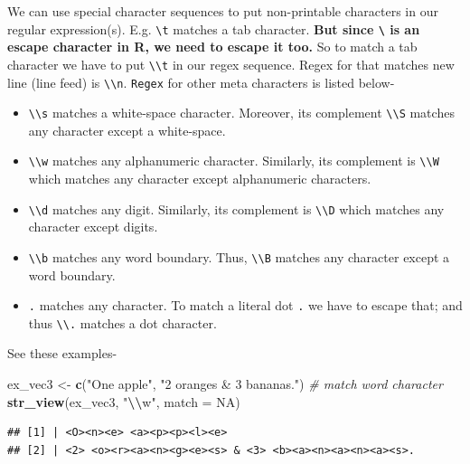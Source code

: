 \documentclass[
]{book}
\newenvironment{Shaded}{\begin{snugshade}}{\end{snugshade}}
\newcommand{\AttributeTok}[1]{\textcolor[rgb]{0.13,0.29,0.53}{#1}}
\newcommand{\CommentTok}[1]{\textcolor[rgb]{0.56,0.35,0.01}{\textit{#1}}}
\newcommand{\ConstantTok}[1]{\textcolor[rgb]{0.56,0.35,0.01}{#1}}
\newcommand{\FunctionTok}[1]{\textcolor[rgb]{0.13,0.29,0.53}{\textbf{#1}}}
\newcommand{\NormalTok}[1]{#1}
\newcommand{\OtherTok}[1]{\textcolor[rgb]{0.56,0.35,0.01}{#1}}
\newcommand{\SpecialCharTok}[1]{\textcolor[rgb]{0.81,0.36,0.00}{\textbf{#1}}}
\newcommand{\StringTok}[1]{\textcolor[rgb]{0.31,0.60,0.02}{#1}}
\providecommand{\tightlist}{%
  \setlength{\itemsep}{0pt}\setlength{\parskip}{0pt}}
\begin{document}
We can use special character sequences to put non-printable characters in our regular expression(s). E.g. \texttt{\textbackslash{}t} matches a tab character. \textbf{But since \texttt{\textbackslash{}} is an escape character in R, we need to escape it too.} So to match a tab character we have to put \texttt{\textbackslash{}\textbackslash{}t} in our regex sequence. Regex for that matches new line (line feed) is \texttt{\textbackslash{}\textbackslash{}n}. \texttt{Regex} for other meta characters is listed below-

\begin{itemize}
\tightlist
\item
  \texttt{\textbackslash{}\textbackslash{}s} matches a white-space character. Moreover, its complement \texttt{\textbackslash{}\textbackslash{}S} matches any character except a white-space.
\item
  \texttt{\textbackslash{}\textbackslash{}w} matches any alphanumeric character. Similarly, its complement is \texttt{\textbackslash{}\textbackslash{}W} which matches any character except alphanumeric characters.
\item
  \texttt{\textbackslash{}\textbackslash{}d} matches any digit. Similarly, its complement is \texttt{\textbackslash{}\textbackslash{}D} which matches any character except digits.
\item
  \texttt{\textbackslash{}\textbackslash{}b} matches any word boundary. Thus, \texttt{\textbackslash{}\textbackslash{}B} matches any character except a word boundary.
\item
  \texttt{.} matches any character. To match a literal dot \texttt{.} we have to escape that; and thus \texttt{\textbackslash{}\textbackslash{}.} matches a dot character.
\end{itemize}

See these examples-

\begin{Shaded}
\begin{Highlighting}[]
\NormalTok{ex\_vec3 }\OtherTok{\textless{}{-}} \FunctionTok{c}\NormalTok{(}\StringTok{"One apple"}\NormalTok{, }\StringTok{"2 oranges \& 3 bananas."}\NormalTok{)}
\CommentTok{\# match word character}
\FunctionTok{str\_view}\NormalTok{(ex\_vec3, }\StringTok{"}\SpecialCharTok{\textbackslash{}\textbackslash{}}\StringTok{w"}\NormalTok{, }\AttributeTok{match =} \ConstantTok{NA}\NormalTok{)}
\end{Highlighting}
\end{Shaded}

\begin{verbatim}
## [1] | <O><n><e> <a><p><p><l><e>
## [2] | <2> <o><r><a><n><g><e><s> & <3> <b><a><n><a><n><a><s>.
\end{verbatim}
\end{document}
